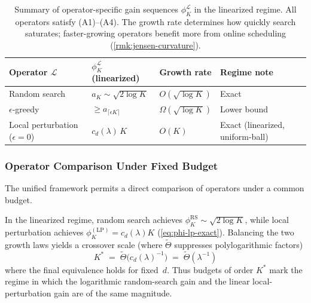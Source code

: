 \begin{table}[t]
\centering
\caption{Summary of operator-specific gain sequences
$\phi_K^{\mathcal{L}}$ in the linearized regime.
All operators satisfy (A1)--(A4).
The growth rate determines how quickly search saturates;
faster-growing operators benefit more from online scheduling
(\cref{rmk:jensen-curvature}).}
\label{tab:phi-summary}
\begin{tabular}{@{}llll@{}}
\toprule
Operator $\mathcal{L}$ & $\phi_K^{\mathcal{L}}$ (linearized) &
Growth rate & Regime note \\
\midrule
Random search &
$a_K\sim\sqrt{2\log K}$ &
$O(\sqrt{\log K})$ &
Exact \\
$\epsilon$-greedy &
$\ge a_{\lceil\epsilon K\rceil}$ &
$\Omega(\sqrt{\log K})$ &
Lower bound \\
Local perturbation ($\epsilon{=}0$) &
$c_d(\lambda)\,K$ &
$O(K)$ &
Exact (linearized, uniform-ball) \\
\bottomrule
\end{tabular}
\end{table}

\subsubsection{Operator Comparison Under Fixed Budget}
\label{sec:operator-comparison}

The unified framework permits a direct comparison of operators under
a common budget.

\begin{proposition}
\label{prop:crossover}
In the linearized regime, random search achieves
$\phi_K^{\mathrm{RS}}\sim\sqrt{2\log K}$,
while local perturbation achieves
$\phi_K^{(\mathrm{LP})}= c_d(\lambda)K$
(\cref{eq:phi-lp-exact}).
Balancing the two growth laws yields a crossover scale
(where $\tilde{\Theta}$ suppresses polylogarithmic factors)
\begin{equation}
  K^*\;=\;\tilde{\Theta}\!\bigl(c_d(\lambda)^{-1}\bigr)
  \;=\;\tilde{\Theta}(\lambda^{-1})
  \label{eq:crossover}
\end{equation}
\noindent
where the final equivalence holds for fixed~$d$.
Thus budgets of order $K^*$ mark the regime in which the logarithmic
random-search gain and the linear local-perturbation gain are of the
same magnitude.
\end{proposition}

